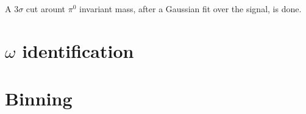 A $3\sigma$ cut arount $\pi^0$ invariant mass, after a Gaussian fit over the signal, is done.

%  


\section{$\omega$ identification}


\section{Binning}


